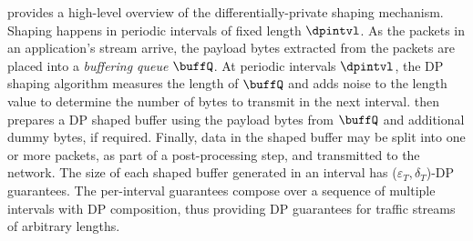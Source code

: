 %
 provides a high-level overview of the
differentially-private shaping mechanism. Shaping happens in periodic intervals
of fixed length $\dpintvl$.
 As the packets in an application's stream arrive, the payload bytes
extracted from the packets are placed into a {\em buffering queue} $\buffQ$.
 At periodic intervals $\dpintvl$, the DP shaping algorithm measures
the length of $\buffQ$ and adds noise to the length value to determine the
number of bytes to transmit in the next interval.
{\sys} then prepares a DP shaped buffer using the payload bytes from
$\buffQ$ and additional dummy bytes, if required.
 Finally, data in the shaped buffer may be split into one or more
packets, as part of a post-processing step, and transmitted to the network.
The size of each shaped buffer generated in an interval has ($\varepsilon_{T},
\delta_{T}$)-DP guarantees. The per-interval guarantees compose over a sequence
of multiple intervals with DP composition, thus providing DP guarantees for
traffic streams of arbitrary lengths.

